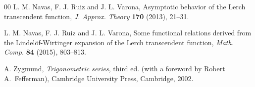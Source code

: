 \documentclass[11pt,a4paper,reqno]{amsart}
\theoremstyle{plain}
\theoremstyle{remark}
\numberwithin{equation}{section}
\begin{document}
\begin{thebibliography}{00}
L. M. Navas, F. J. Ruiz and J. L. Varona,
Asymptotic behavior of the Lerch transcendent function,
\textit{J. Approx. Theory} \textbf{170} (2013), 21--31.

L. M. Navas, F. J. Ruiz and J. L. Varona,
Some functional relations derived from the Lindel\"of-Wirtinger 
expansion of the Lerch transcendent function,
\textit{Math. Comp.} \textbf{84} (2015), 803--813.

A. Zygmund,
\textit{Trigonometric series}, third ed. (with a foreword by Robert A.~Fefferman),
Cambridge University Press, Cambridge, 2002.

\end{thebibliography}

\end{document}
